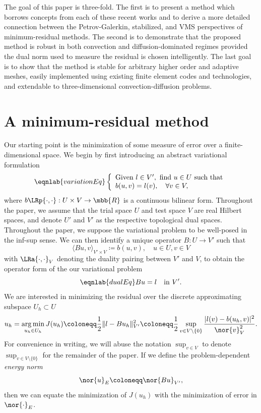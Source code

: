 The goal of this paper is three-fold.  The first is to present a method which borrows concepts from each of these recent works and to derive a more detailed connection between the Petrov-Galerkin, stabilized, and VMS perspectives of minimum-residual methods.  The second is to demonstrate that the proposed method is robust in both convection and diffusion-dominated regimes provided the dual norm used to measure the residual is chosen intelligently.  The last goal is to show that the method is stable for arbitrary higher order and adaptive meshes, easily implemented using existing finite element codes and technologies, and extendable to three-dimensional convection-diffusion problems.

\section{A minimum-residual method}

Our starting point is the minimization of some measure of error over a finite-dimensional space.  We begin by first introducing an abstract variational formulation 
\begin{equation}
\eqnlab{variationEq}
\left\{
  \begin{array}{l}
    \text{Given } l \in V', \text{ find } u \in U  \text{ such that} \\ 
    b(u,v) = l(v), \quad \forall v\in V,
  \end{array}
  \right.
\end{equation}
where $b\LRp{\cdot,\cdot}: U \times V \to \mbb{R}$ is a continuous bilinear form.  Throughout the paper, we assume that the trial space $U$ and test space $V$ are real Hilbert spaces, and denote $U'$ and $V'$ as the respective topological dual spaces.  Throughout the paper, we suppose the variational problem  to be well-posed in the inf-sup sense. We can then identify a unique operator $B:U\rightarrow V'$ such that 
\[
\langle Bu,v\rangle_{V' \times V} \coloneqq b(u,v), \quad u\in U, v\in V
\]
with $\LRa{\cdot, \cdot}_V$ denoting the duality pairing between $V'$ and $V$, to obtain the operator form of the our variational problem
\begin{equation}
\eqnlab{dualEq}
Bu = l \quad \text{in } V'.
\end{equation}
We are interested in minimizing the residual over the discrete approximating subspace $U_h \subset U$
\[
u_h = \underset{u_h\in U_h}{\arg\min}\, J(u_h) \coloneqq \frac{1}{2}\|l-Bu_h\|_{V'}^2 \coloneqq\frac{1}{2} \sup_{v\in V\setminus\{0\}} \frac{| l(v)- b(u_h,v)|^2}{\nor{v}_V^2}.
\]
For convenience in writing, we will abuse the notation $\sup_{v \in V}$ to denote $\sup_{v\in V\setminus\{0\}}$ for the remainder of the paper.  If we define the problem-dependent \textit{energy norm} 
\[
\nor{u}_E \coloneqq \nor{Bu}_{V'},
\]
then we can equate the minimization of $J(u_h)$ with the minimization of error in $\nor{\cdot}_E$. 

